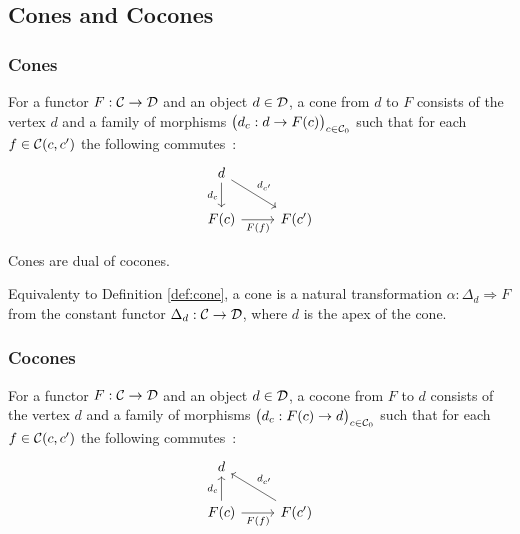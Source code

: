 \subsection{Cones and Cocones}

\subsubsection*{Cones}

\begin{definition}
	For a functor $F:\mathcal{C}\to \mathcal{D}$ and an object $d\in \mathcal{D}$, a cone from $d$ to $F$
	consists of the vertex $d$ and a family of morphisms $\big(d_c: d \to
	F(c)\big)_{c\in \mathcal{C}_0}$ such that for each $f\in \mathcal{C}(c, c')$ the following
	commutes~\parencite{awodey:category_theory}:
	\[\begin{tikzcd}
		d \\
		{F(c)} & {F(c')}
		\arrow["{d_{c'}}", from=1-1, to=2-2]
		\arrow["{d_c}"', from=1-1, to=2-1]
		\arrow["{F(f)}"', from=2-1, to=2-2]
	\end{tikzcd}\]
\end{definition}

\begin{remark}
	Cones are dual of cocones.
\end{remark}

\begin{definition}
	Equivalenty to Definition \ref{def:cone}, a cone is a natural transformation
	$\alpha: \Delta_d \Rightarrow F$ from the constant functor $\Delta_d:\mathcal{C}\to
	\mathcal{D}$, where $d$ is the apex of the cone.
\end{definition}

\subsubsection*{Cocones}
\begin{definition}
	For a functor $F:\mathcal{C}\to \mathcal{D}$ and an object $d\in \mathcal{D}$, a cocone from $F$ to $d$
	consists of the vertex $d$ and a family of morphisms $\big(d_c: F(c) \to
	d\big)_{c\in \mathcal{C}_0}$ such that for each $f \in \mathcal{C}(c, c')$ the following
	commutes~\parencite{leinster:basic_category_theory}:
	\[\begin{tikzcd}[ampersand replacement=\&]
		d \\
		{F(c)} \& {F(c')}
		\arrow["{d_{c'}}"', from=2-2, to=1-1]
		\arrow["{d_c}", from=2-1, to=1-1]
		\arrow["{F(f)}"', from=2-1, to=2-2]
	\end{tikzcd}\]
\end{definition}

